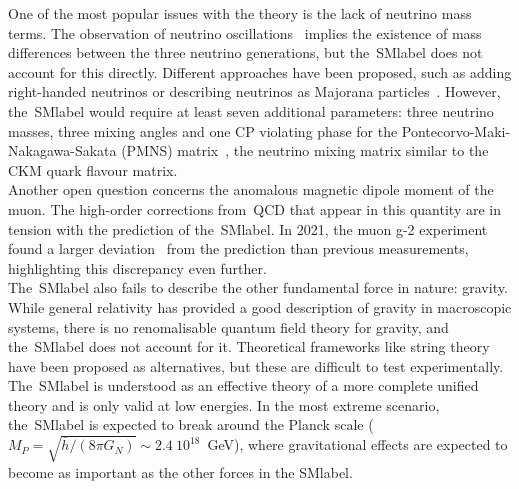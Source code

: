 One of the most popular issues with the theory is the lack of neutrino mass terms. The observation of neutrino oscillations~\cite{neutrinoosc}  implies the existence of mass differences between the three neutrino generations, but the~\acrshort{SMlabel} does not account for this directly. Different approaches have been proposed, such as adding right-handed neutrinos or describing neutrinos as Majorana particles~\cite{Majorana2006}. However, the~\acrshort{SMlabel} would require at least seven additional parameters: three neutrino masses, three mixing angles and one CP violating phase for the Pontecorvo-Maki-Nakagawa-Sakata (PMNS) matrix~\cite{10.1143/PTP.28.870,Pontecorvo:1967fh}, the neutrino mixing matrix similar to the CKM quark flavour matrix.\\

Another open question concerns the anomalous magnetic dipole moment of the muon. The high-order corrections from~\acrshort{QCD} that appear in this quantity are in tension with the prediction of the~\acrshort{SMlabel}. In 2021, the muon g-2 experiment found a larger deviation~\cite{PhysRevLett.126.141801} from the prediction than previous measurements, highlighting this discrepancy even further.\\


The~\acrshort{SMlabel} also fails to describe the other fundamental force in nature: gravity. While general relativity has provided a good description of gravity in macroscopic systems, there is no renomalisable quantum field theory for gravity, and the~\acrshort{SMlabel} does not account for it. Theoretical frameworks like string theory have been proposed as alternatives, but these are difficult to test experimentally. The~\acrshort{SMlabel} is understood as an effective theory of a more complete unified theory and is only valid at low energies. In the most extreme scenario, the~\acrshort{SMlabel} is expected to break around the Planck scale ($M_P=\sqrt{\bar{h}/(8\pi G_N)}\sim 2.4\ 10^{18}$~GeV), where gravitational effects are expected to become as important as the other forces in the \acrshort{SMlabel}.\\

